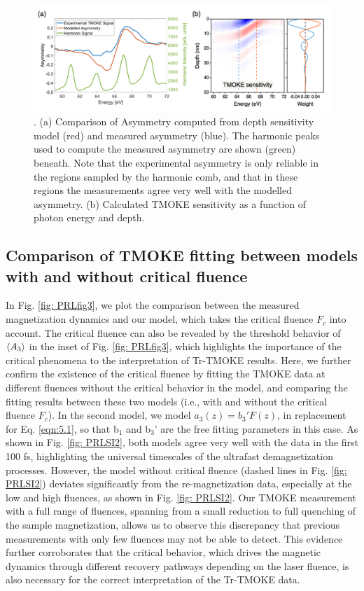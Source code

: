 \begin{figure}
	\label{fig: PRLSI1}
	\begin{center}
		\includegraphics[width=150mm]{figs/PRLSI1}
	\end{center}
	\caption{. (a) Comparison of Asymmetry computed from depth sensitivity model (red) and measured asymmetry (blue). The harmonic peaks used to compute the measured asymmetry are shown (green) beneath. Note that the experimental asymmetry is only reliable in the regions sampled by the harmonic comb, and that in these regions the measurements agree very well with the modelled asymmetry. (b) Calculated TMOKE sensitivity as a function of photon energy and depth.}
\end{figure}

\subsection{Comparison of TMOKE fitting between models with and without critical fluence}

In Fig. \ref{fig: PRLfig3}, we plot the comparison between the measured magnetization dynamics and our model, which takes the critical fluence $F_c$ into account. The critical fluence can also be revealed by the threshold behavior of $\braket{A_3}$ in the inset of Fig. \ref{fig: PRLfig3}, which highlights the importance of the critical phenomena to the interpretation of Tr-TMOKE results. Here, we further confirm the existence of the critical fluence by fitting the TMOKE data at different fluences without the critical behavior in the model, and comparing the fitting results between these two models (i.e., with and without the critical fluence $F_c$). In the second model, we model $a_3(z)=b_3'F(z)$, in replacement for Eq. \ref{eqn:5.1}, so that b$_1$ and b$_3$' are the free fitting parameters in this case. As shown in Fig. \ref{fig: PRLSI2}, both models agree very well with the data in the first 100 fs, highlighting the universal timescales of the ultrafast demagnetization processes. However, the model without critical fluence (dashed lines in Fig. \ref{fig: PRLSI2}) deviates significantly from the re-magnetization data, especially at the low and high fluences, as shown in Fig. \ref{fig: PRLSI2}. Our TMOKE measurement with a full range of fluences, spanning from a small reduction to full quenching of the sample magnetization, allows us to observe this discrepancy that previous measurements with only few fluences may not be able to detect. This evidence further corroborates that the critical behavior, which drives the magnetic dynamics through different recovery pathways depending on the laser fluence, is also necessary for the correct interpretation of the Tr-TMOKE data.  

